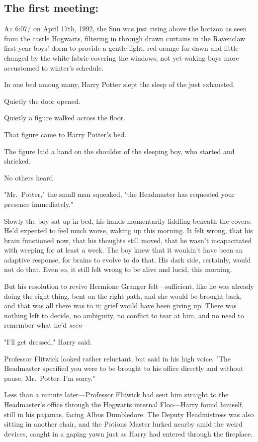 
\subsection{The first meeting:}

\lettrine{A}{t} 6:07\AM/ on April 17th, 1992, the Sun was just rising above the horizon as seen
from the castle Hogwarts, filtering in through drawn curtains in the Ravenclaw
first-year boys' dorm to provide a gentle light, red-orange for dawn and
little-changed by the white fabric covering the windows, not yet waking boys
more accustomed to winter's schedule.

In one bed among many, Harry Potter slept the sleep of the just exhausted.

Quietly the door opened.

Quietly a figure walked across the floor.

That figure came to Harry Potter's bed.

The figure laid a hand on the shoulder of the sleeping boy, who started and
shrieked.

No others heard.

"Mr.~Potter," the small man squeaked, "the Headmaster has requested your
presence immediately."

Slowly the boy sat up in bed, his hands momentarily fiddling beneath the
covers. He'd expected to feel much worse, waking up this morning. It
felt{\el} wrong, that his brain functioned now, that his thoughts still
moved, that he wasn't incapacitated with weeping for at least a week. The boy
knew that it wouldn't have been an adaptive response, for brains to evolve to
do that. His dark side, certainly, would not do that. Even so, it still felt
wrong to be alive and lucid, this morning.

But his resolution to revive Hermione Granger felt---sufficient, like he was
already doing the right thing, bent on the right path, and she would be brought
back, and that was all there was to it; grief would have been giving up. There
was nothing left to decide, no ambiguity, no conflict to tear at him, and no
need to remember what he'd \emph{seen}---

"I'll get dressed," Harry said.

Professor Flitwick looked rather reluctant, but said in his high voice, "The
Headmaster specified you were to be brought to his office directly and without
pause, Mr.~Potter. I'm sorry."

Less than a minute later---Professor Flitwick had sent him straight to the
Headmaster's office through the Hogwarts internal Floo---Harry found himself,
still in his pajamas, facing Albus Dumbledore. The Deputy Headmistress was also
sitting in another chair, and the Potions Master lurked nearby amid the weird
devices, caught in a gaping yawn just as Harry had entered through the
fireplace.

